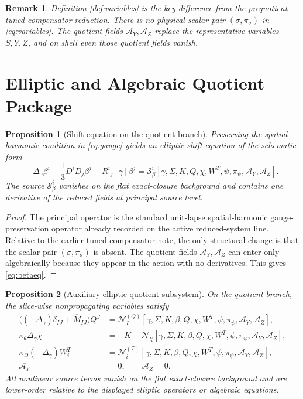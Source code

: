 \documentclass[11pt]{article}
\newcommand{\AY}{\mathcal A_Y}
\newcommand{\AZ}{\mathcal A_Z}
\newtheorem{proposition}{Proposition}
\newtheorem{remark}{Remark}
\begin{document}
\begin{remark}
Definition \ref{def:variables} is the key difference from the prequotient tuned-compensator reduction. There is no physical scalar pair \((\sigma,\pi_\sigma)\) in \eqref{eq:variables}. The quotient fields \(\AY,\AZ\) replace the representative variables \(S,Y,Z\), and on shell even those quotient fields vanish.
\end{remark}

\section{Elliptic and Algebraic Quotient Package}

\begin{proposition}[Shift equation on the quotient branch]
\label{prop:shift}
Preserving the spatial-harmonic condition in \eqref{eq:gauge} yields an elliptic shift equation of the schematic form
\begin{equation}
-\Delta_\gamma\beta^i
-\frac13D^iD_j\beta^j
+R^i{}_j[\gamma]\beta^j
=
\mathcal S_\beta^i[\gamma,\Sigma,K,Q,\chi,W^T,\psi,\pi_\psi,\AY,\AZ].
\label{eq:betaeq}
\end{equation}
The source \(\mathcal S_\beta^i\) vanishes on the flat exact-closure background and contains one derivative of the reduced fields at principal source level.
\end{proposition}

\begin{proof}
The principal operator is the standard unit-lapse spatial-harmonic gauge-preservation operator already recorded on the active reduced-system line. Relative to the earlier tuned-compensator note, the only structural change is that the scalar pair \((\sigma,\pi_\sigma)\) is absent. The quotient fields \(\AY,\AZ\) can enter only algebraically because they appear in the action with no derivatives. This gives \eqref{eq:betaeq}.
\end{proof}

\begin{proposition}[Auxiliary-elliptic quotient subsystem]
\label{prop:aux}
On the quotient branch, the slice-wise nonpropagating variables satisfy
\begin{align}
\bigl((-\Delta_\gamma)\delta_{IJ}+\widehat M_{IJ}\bigr)Q^J
&=
\mathcal N_I^{(Q)}[\gamma,\Sigma,K,\beta,Q,\chi,W^T,\psi,\pi_\psi,\AY,\AZ],
\label{eq:Qeq}
\\
\kappa_\theta\Delta_\gamma\chi
&=
-K+\mathcal N_\chi[\gamma,\Sigma,K,\beta,Q,\chi,W^T,\psi,\pi_\psi,\AY,\AZ],
\label{eq:chieq}
\\
\kappa_\Omega(-\Delta_\gamma)W_i^T
&=
\mathcal N_i^{(T)}[\gamma,\Sigma,K,\beta,Q,\chi,W^T,\psi,\pi_\psi,\AY,\AZ],
\label{eq:WTeq}
\\
\AY&=0,
\qquad
\AZ=0.
\label{eq:AZeq}
\end{align}
All nonlinear source terms vanish on the flat exact-closure background and are lower-order relative to the displayed elliptic operators or algebraic equations.
\end{proposition}
\end{document}
